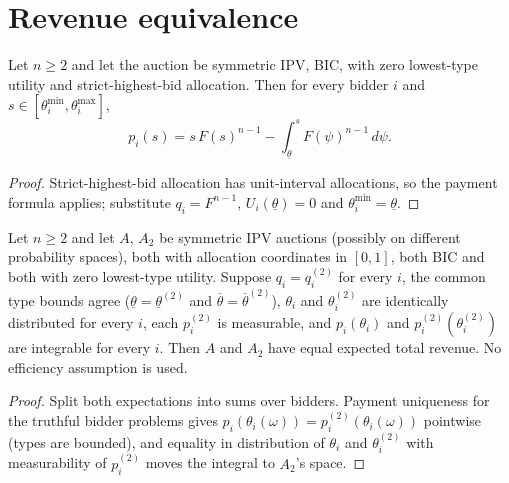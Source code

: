 \section{Revenue equivalence}

\begin{lemma}\label{thm:MathEconLib.Auction.payment_formula_strictHighestBid}\leanok
{}
Let $n\ge2$ and let the auction be symmetric IPV, BIC, with zero lowest-type utility and strict-highest-bid allocation. Then for every bidder $i$ and $s\in[\theta^{\min}_i,\theta^{\max}_i]$,
\[
p_i(s)=s\,F(s)^{n-1}-\int_{\underline\theta}^{s}F(\psi)^{n-1}\,d\psi.
\]
\end{lemma}
\begin{proof}\leanok
{}
Strict-highest-bid allocation has unit-interval allocations, so the payment formula applies; substitute $q_i=F^{n-1}$, $U_i(\underline\theta)=0$ and $\theta^{\min}_i=\underline\theta$.
\end{proof}

\begin{theorem}\label{thm:MathEconLib.Auction.revenue_equivalence}\leanok
{}
Let $n\ge2$ and let $A$, $A_2$ be symmetric IPV auctions (possibly on different probability spaces), both with allocation coordinates in $[0,1]$, both BIC and both with zero lowest-type utility. Suppose $q_i=q^{(2)}_i$ for every $i$, the common type bounds agree ($\underline\theta=\underline\theta^{(2)}$ and $\overline\theta=\overline\theta^{(2)}$), $\theta_i$ and $\theta^{(2)}_i$ are identically distributed for every $i$, each $p^{(2)}_i$ is measurable, and $p_i(\theta_i)$ and $p^{(2)}_i(\theta^{(2)}_i)$ are integrable for every $i$. Then $A$ and $A_2$ have equal expected total revenue. No efficiency assumption is used.
\end{theorem}
\begin{proof}\leanok
{}
Split both expectations into sums over bidders. Payment uniqueness for the truthful bidder problems gives $p_i(\theta_i(\omega))=p^{(2)}_i(\theta_i(\omega))$ pointwise (types are bounded), and equality in distribution of $\theta_i$ and $\theta^{(2)}_i$ with measurability of $p^{(2)}_i$ moves the integral to $A_2$'s space.
\end{proof}

